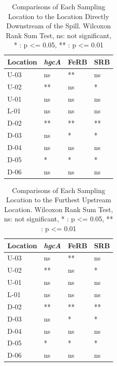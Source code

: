 \documentclass[ms, hidelinks]{uncgdissertationexp}
\theoremstyle{plain}
\theoremstyle{definition}
\theoremstyle{remark}
\begin{document}
\begin{table}[htbp]

\caption[Comparisons of Each Sampling Location to the Location Directly Downstream of the Spill.]{\label{tab:compare}Comparisons of Each Sampling Location to the Location Directly Downstream of the Spill. Wilcoxon Rank Sum Test, ns: not significant, * : p <= 0.05, ** : p <= 0.01}
\centering
\begin{tabular}{llll}
\toprule
Location & \textit{hgcA} & FeRB & SRB\\
\midrule
U-03 & ns & ** & ns\\
U-02 & ** & ns & *\\
U-01 & ns & ns & ns\\
L-01 & ns & ns & ns\\
D-02 & ** & ** & **\\
D-03 & ns & * & *\\
D-04 & ns & ns & ns\\
D-05 & * & * & *\\
D-06 & ns & ns & ns\\
\bottomrule
\end{tabular}
\end{table}
\begin{table}[htbp]

\caption[Comparisons of Each Sampling Location to the Furthest Upstream Location.]{\label{tab:compareU}Comparisons of Each Sampling Location to the Furthest Upstream Location. Wilcoxon Rank Sum Test, ns: not significant, * : p <= 0.05, ** : p <= 0.01}
\centering
\begin{tabular}{llll}
\toprule
Location & \textit{hgcA} & FeRB & SRB\\
\midrule
U-03 & ns & ** & ns\\
U-02 & ** & ns & *\\
U-01 & ns & ns & ns\\
L-01 & ns & ns & ns\\
D-02 & ** & ** & **\\
D-03 & ns & * & *\\
D-04 & ns & ns & ns\\
D-05 & * & * & *\\
D-06 & ns & ns & ns\\
\bottomrule
\end{tabular}
\end{table}
\end{document}
